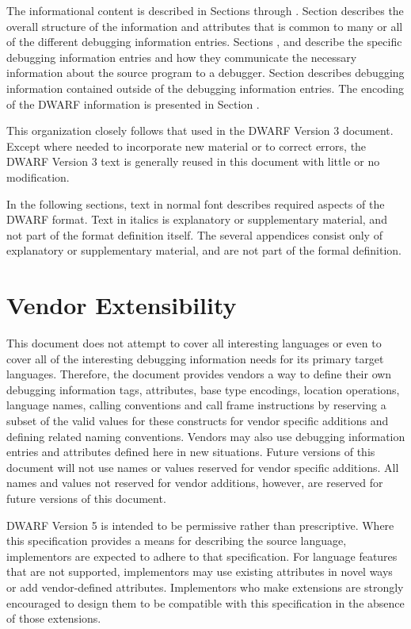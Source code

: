 The informational content is described in 
Sections  
through
. 
Section  
describes the overall structure of the information
and attributes that is common to many or all of the different
debugging information entries. 
Sections , 
 and 
 describe
the specific debugging information entries and how they
communicate the necessary information about the source program
to a debugger. 
Section  
describes debugging information
contained outside of the debugging information entries. The
encoding of the DWARF information is presented in 
Section .

This organization closely follows that used in the DWARF
Version 3 document. Except where needed to incorporate
new material or to correct errors, the DWARF Version 3
text is generally reused in this document with little or
no modification.

In the following sections, text in normal font describes
required aspects of the DWARF format.  Text in italics is
explanatory or supplementary material, and not part of the
format definition itself. The several appendices consist only
of explanatory or supplementary material, and are not part
of the formal definition.
\section{Vendor Extensibility}

This document does not attempt to cover all interesting
languages or even to cover all of the interesting debugging
information needs for its primary target languages. 
Therefore,
the document provides vendors a way to define their own
debugging information tags, attributes, base type encodings,
location operations, language names, calling conventions and
call frame instructions by reserving a subset of the valid
values for these constructs for vendor specific additions
and defining related naming conventions. 
Vendors may also use
debugging information entries and attributes defined here in
new situations. 
Future versions of this document will not use
names or values reserved for vendor specific additions. 
All
names and values not reserved for vendor additions, however,
are reserved for future versions of this document.

DWARF Version 5 is intended to be permissive rather than
prescriptive. 
Where this specification provides a means for
describing the source language, implementors are expected
to adhere to that specification. 
For language features that
are not supported, implementors may use existing attributes
in novel ways or add vendor-defined attributes. 
Implementors
who make extensions are strongly encouraged to design them
to be compatible with this specification in the absence of
those extensions.

